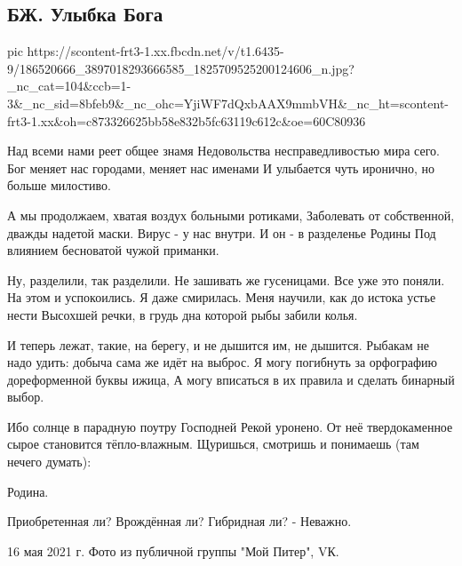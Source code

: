  
 
 
 
 

\subsection{БЖ. Улыбка Бога}

\ifcmt
  pic https://scontent-frt3-1.xx.fbcdn.net/v/t1.6435-9/186520666_3897018293666585_1825709525200124606_n.jpg?_nc_cat=104&ccb=1-3&_nc_sid=8bfeb9&_nc_ohc=YjiWF7dQxbAAX9mmbVH&_nc_ht=scontent-frt3-1.xx&oh=c873326625bb58e832b5fc63119c612c&oe=60C80936
\fi


Над всеми нами реет общее знамя 
Недовольства несправедливостью мира сего.
Бог меняет нас городами, меняет нас именами
И улыбается чуть иронично, но больше милостиво.

А мы продолжаем, хватая воздух больными ротиками,
Заболевать от собственной, дважды надетой маски.
Вирус - у нас внутри. И он - в разделенье Родины
Под влиянием бесноватой чужой приманки.

Ну, разделили, так разделили. Не зашивать же гусеницами.
Все уже это поняли. На этом и успокоились.
Я даже смирилась. Меня научили, как до истока устье нести
Высохшей речки, в грудь дна которой рыбы забили колья.

И теперь лежат, такие, на берегу, и не дышится им, не дышится.
Рыбакам не надо удить: добыча сама же идёт на выброс.
Я могу погибнуть за орфографию дореформенной буквы ижица,
А могу вписаться в их правила и сделать бинарный выбор.

Ибо солнце в парадную поутру Господней Рекой уронено.
От неё твердокаменное сырое становится тёпло-влажным.
Щуришься, смотришь и понимаешь (там нечего думать): 

Родина.

Приобретенная ли? Врождённая ли? Гибридная ли? - Неважно.

16 мая 2021 г.
Фото из публичной группы "Мой Питер", VК.
